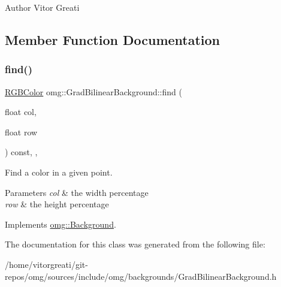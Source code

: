 \begin{DoxyAuthor}{Author}
Vitor Greati 
\end{DoxyAuthor}


\subsection{Member Function Documentation}
\mbox{\label{classomg_1_1_grad_bilinear_background_a074c489f7e8514420bd1e1f362202b03}} 
\subsubsection{\texorpdfstring{find()}{find()}}
{\footnotesize\ttfamily \mbox{\hyperlink{classtao_1_1_col}{R\+G\+B\+Color}} omg\+::\+Grad\+Bilinear\+Background\+::find (\begin{DoxyParamCaption}\item[{float}]{col,  }\item[{float}]{row }\end{DoxyParamCaption}) const\hspace{0.3cm}{\ttfamily [inline]}, {\ttfamily [override]}, {\ttfamily [virtual]}}



Find a color in a given point. 


\begin{DoxyParams}{Parameters}
{\em col} & the width percentage \\
\hline
{\em row} & the height percentage \\
\hline
\end{DoxyParams}


Implements \mbox{\hyperlink{classomg_1_1_background_a9f98d6bc2e213de258b5c3e45040b462}{omg\+::\+Background}}.



The documentation for this class was generated from the following file\+:\begin{DoxyCompactItemize}
\item 
/home/vitorgreati/git-\/repos/omg/sources/include/omg/backgrounds/Grad\+Bilinear\+Background.\+h\end{DoxyCompactItemize}
